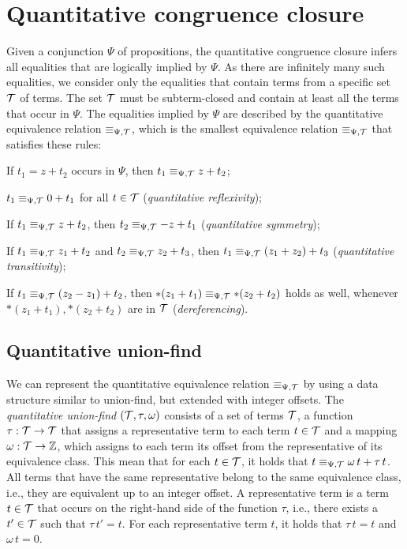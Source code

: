 \section{Quantitative congruence closure}\label{chapter:qcc}

Given a conjunction $\Psi$ of propositions, the quantitative congruence closure infers all equalities that are logically implied by $\Psi$.
As there are infinitely many such equalities, we consider only the equalities that contain terms from a specific set $\mathcal{T}$ of terms.
The set $\mathcal{T}$ must be subterm-closed and contain at least all the terms that occur in $\Psi$.
The equalities implied by $\Psi$ are described by the quantitative equivalence relation $\equiv_{\Psi,\mathcal{T}}$,
which is the smallest equivalence relation $\equiv_{\Psi,\mathcal{T}}$ that satisfies these rules:
\begin{enumerate}[label={[E\arabic*]}, ref={[E\arabic*]}]
  \setcounter{enumi}{-1}
\item\label{item:persistence} If $t_1 = z+t_2$ occurs in $\Psi$, then $t_1 \equiv_{\Psi,\mathcal{T}} z+t_2$;
\item\label{item:quantitative-reflexivity} $t_1 \equiv_{\Psi,\mathcal{T}} 0+t_1$ for all $t\in\mathcal{T}$ (\emph{quantitative reflexivity});
\item\label{item:quantitative-symmetry} If $t_1 \equiv_{\Psi,\mathcal{T}} z+t_2$, then $t_2 \equiv_{\Psi,\mathcal{T}} -z+t_1$ (\emph{quantitative symmetry});
\item\label{item:quantitative-transitivity} If $t_1 \equiv_{\Psi,\mathcal{T}} z_1+t_2$ and $t_2 \equiv_{\Psi,\mathcal{T}} z_2 + t_3$,
		then $t_1 \equiv_{\Psi,\mathcal{T}} (z_1+z_2)+t_3$ (\emph{quantitative transitivity});
\item\label{item:dereferencing} If $t_1 \equiv_{\Psi,\mathcal{T}} (z_2 - z_1) + t_2$, then $*(z_1 + t_1) \equiv_{\Psi,\mathcal{T}} *(z_2 + t_2)$ holds as well, whenever $*(z_1 + t_1),  *(z_2 + t_2)$ are in $\mathcal{T}$ (\emph{dereferencing}).
\end{enumerate}

\subsection{Quantitative union-find}\label{subsection:quantitative-union-find}

We can represent the quantitative equivalence relation $\equiv_{\Psi,\mathcal{T}}$ by using a data structure similar to union-find, but extended with integer offsets.
The \emph{quantitative union-find} $(\mathcal{T}, \tau, \omega)$ consists of a set of terms $\mathcal{T}$,
a function $\tau : \mathcal{T} \rightarrow \mathcal{T}$ that assigns a representative term to each term $t \in \mathcal{T}$ and a mapping $\omega : \mathcal{T} \rightarrow \mathbb{Z}$,
which assigns to each term its offset from the representative of its equivalence class.
This mean that for each $t \in \mathcal{T}$, it holds that $t \equiv_{\Psi,\mathcal{T}} \omega\,t + \tau\,t$.
All terms that have the same representative belong to the same equivalence class, i.e., they are equivalent up to an integer offset.
A representative term is a term $t \in \mathcal{T}$ that occurs on the right-hand side of the function $\tau$,
i.e., there exists a $t'\in \mathcal{T}$ such that $\tau\,t' = t$.
For each representative term $t$, it holds that $\tau\,t=t$ and $\omega\,t = 0$.

